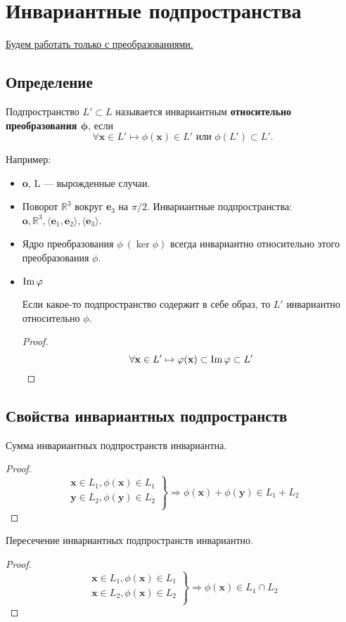 \section{Инвариантные подпространства}
\underline{Будем работать только с преобразованиями.} %
\subsection{Определение}
\begin{definition}
Подпространство $L' \subset L$ называется \textsf{инвариантным} \textbf{относительно преобразования $\bm\phi$}, если
$$
\forall \textbf{x} \in L' \mapsto \phi(\textbf{x}) \in L'\text{ или }\phi(L')\subset L'.
$$
\end{definition}
Например:
\begin{itemize}
	\item \textbf{o}, L --- вырожденные случаи.
	\item Поворот $\mathbb{R}^3$ вокруг \textbf{e$_3$} на $\pi/2$. Инвариантные подпространства: $\textbf{o}, \mathbb{R}^3, \langle \textbf{e$_1$}, \textbf{e$_2$} \rangle, \langle \textbf{e$_3$}\rangle$.
	\item Ядро преобразования $\phi \ (\ker \phi)$ всегда инвариантно относительно этого преобразования $\phi$.
	\item $\operatorname{\mathop{Im}} \varphi$
	\begin{theorem}
	Если какое-то подпространство содержит в себе образ, то $L'$ инвариантно относительно $\phi$.
	\end{theorem}
	\begin{proof}
		$$\forall \textbf{x} \in L' \mapsto \varphi(\textbf{x}) \subset \operatorname{\mathop{Im}}\varphi\subset L'$$
	\end{proof}
\end{itemize}
\subsection{Свойства инвариантных подпространств}
\begin{predlog}
	Сумма инвариантных подпространств инвариантна.
\end{predlog}
\begin{proof}
	$$
	\left.
	\begin{array}{r}
		\textbf{x} \in L_1, \phi(\textbf{x}) \in L_1\\
		\textbf{y} \in L_2, \phi(\textbf{y}) \in L_2\\
	\end{array}
	\right\} \Rightarrow \phi(\textbf{x}) + \phi(\textbf{y}) \in L_1 + L_2
	$$
\end{proof}
\begin{predlog}
	Пересечение инвариантных подпространств инвариантно.
\end{predlog}
\begin{proof}
	$$
	\left.
	\begin{array}{r}
	\textbf{x} \in L_1, \phi(\textbf{x}) \in L_1\\
	\textbf{x} \in L_2, \phi(\textbf{x}) \in L_2\\
	\end{array}
	\right\} \Rightarrow \phi(\textbf{x}) \in L_1 \cap L_2
	$$
\end{proof}
